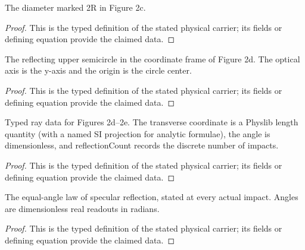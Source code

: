 \begin{definition}
  \label{def:physics:IPhO_2026_2_A_1:aux004}
  The diameter marked 2R in Figure 2c.
\end{definition}
\begin{proof}
  This is the typed definition of the stated physical carrier; its fields or defining equation provide the claimed data.
\end{proof}

\begin{definition}
  \label{def:physics:IPhO_2026_2_A_1:aux005}
  The reflecting upper semicircle in the coordinate frame of Figure 2d. The optical axis is the y-axis and the origin is the circle center.
\end{definition}
\begin{proof}
  This is the typed definition of the stated physical carrier; its fields or defining equation provide the claimed data.
\end{proof}

\begin{definition}
  \label{def:physics:IPhO_2026_2_A_1:aux006}
  Typed ray data for Figures 2d--2e.  The transverse coordinate is a Physlib
  length quantity (with a named SI projection for analytic formulae), the angle
  is dimensionless, and reflectionCount records the discrete number of impacts.
\end{definition}
\begin{proof}
  This is the typed definition of the stated physical carrier; its fields or defining equation provide the claimed data.
\end{proof}

\begin{definition}
  \label{def:physics:IPhO_2026_2_A_1:aux007}
  The equal-angle law of specular reflection, stated at every actual impact. Angles are dimensionless real readouts in radians.
\end{definition}
\begin{proof}
  This is the typed definition of the stated physical carrier; its fields or defining equation provide the claimed data.
\end{proof}

